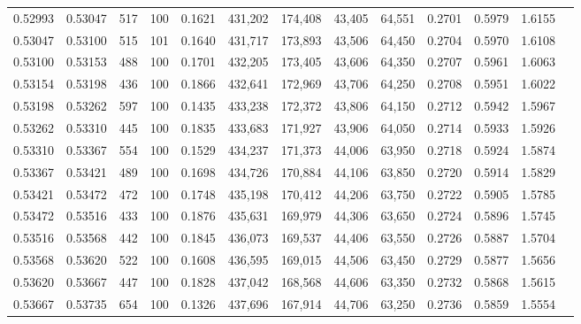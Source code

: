 \begin{tabular}{rrrrrrrrrrrrr}
0.52993 & 0.53047 &   517 & 100 &                                     0.1621 & 431,202 & 174,408 &  43,405 &  64,551 & 0.2701 & 0.5979 & 1.6155 \\
0.53047 & 0.53100 &   515 & 101 &                                     0.1640 & 431,717 & 173,893 &  43,506 &  64,450 & 0.2704 & 0.5970 & 1.6108 \\
0.53100 & 0.53153 &   488 & 100 &                                     0.1701 & 432,205 & 173,405 &  43,606 &  64,350 & 0.2707 & 0.5961 & 1.6063 \\
0.53154 & 0.53198 &   436 & 100 &                                     0.1866 & 432,641 & 172,969 &  43,706 &  64,250 & 0.2708 & 0.5951 & 1.6022 \\
0.53198 & 0.53262 &   597 & 100 &                                     0.1435 & 433,238 & 172,372 &  43,806 &  64,150 & 0.2712 & 0.5942 & 1.5967 \\
0.53262 & 0.53310 &   445 & 100 &                                     0.1835 & 433,683 & 171,927 &  43,906 &  64,050 & 0.2714 & 0.5933 & 1.5926 \\
0.53310 & 0.53367 &   554 & 100 &                                     0.1529 & 434,237 & 171,373 &  44,006 &  63,950 & 0.2718 & 0.5924 & 1.5874 \\
0.53367 & 0.53421 &   489 & 100 &                                     0.1698 & 434,726 & 170,884 &  44,106 &  63,850 & 0.2720 & 0.5914 & 1.5829 \\
0.53421 & 0.53472 &   472 & 100 &                                     0.1748 & 435,198 & 170,412 &  44,206 &  63,750 & 0.2722 & 0.5905 & 1.5785 \\
0.53472 & 0.53516 &   433 & 100 &                                     0.1876 & 435,631 & 169,979 &  44,306 &  63,650 & 0.2724 & 0.5896 & 1.5745 \\
0.53516 & 0.53568 &   442 & 100 &                                     0.1845 & 436,073 & 169,537 &  44,406 &  63,550 & 0.2726 & 0.5887 & 1.5704 \\
0.53568 & 0.53620 &   522 & 100 &                                     0.1608 & 436,595 & 169,015 &  44,506 &  63,450 & 0.2729 & 0.5877 & 1.5656 \\
0.53620 & 0.53667 &   447 & 100 &                                     0.1828 & 437,042 & 168,568 &  44,606 &  63,350 & 0.2732 & 0.5868 & 1.5615 \\
0.53667 & 0.53735 &   654 & 100 &                                     0.1326 & 437,696 & 167,914 &  44,706 &  63,250 & 0.2736 & 0.5859 & 1.5554 \\

\end{tabular}
